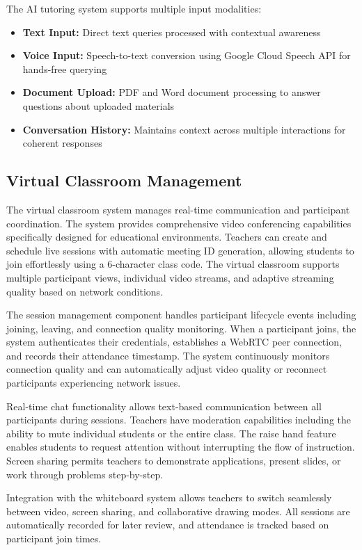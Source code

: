 \documentclass[onecolumn]{IEEEtran}
\begin{document}
The AI tutoring system supports multiple input modalities:

\begin{itemize}
\item \textbf{Text Input:} Direct text queries processed with contextual awareness
\item \textbf{Voice Input:} Speech-to-text conversion using Google Cloud Speech API for hands-free querying
\item \textbf{Document Upload:} PDF and Word document processing to answer questions about uploaded materials
\item \textbf{Conversation History:} Maintains context across multiple interactions for coherent responses
\end{itemize}

\subsection{Virtual Classroom Management}

The virtual classroom system manages real-time communication and participant coordination. The system provides comprehensive video conferencing capabilities specifically designed for educational environments. Teachers can create and schedule live sessions with automatic meeting ID generation, allowing students to join effortlessly using a 6-character class code. The virtual classroom supports multiple participant views, individual video streams, and adaptive streaming quality based on network conditions.

The session management component handles participant lifecycle events including joining, leaving, and connection quality monitoring. When a participant joins, the system authenticates their credentials, establishes a WebRTC peer connection, and records their attendance timestamp. The system continuously monitors connection quality and can automatically adjust video quality or reconnect participants experiencing network issues.

Real-time chat functionality allows text-based communication between all participants during sessions. Teachers have moderation capabilities including the ability to mute individual students or the entire class. The raise hand feature enables students to request attention without interrupting the flow of instruction. Screen sharing permits teachers to demonstrate applications, present slides, or work through problems step-by-step.

Integration with the whiteboard system allows teachers to switch seamlessly between video, screen sharing, and collaborative drawing modes. All sessions are automatically recorded for later review, and attendance is tracked based on participant join times.
\end{document}
